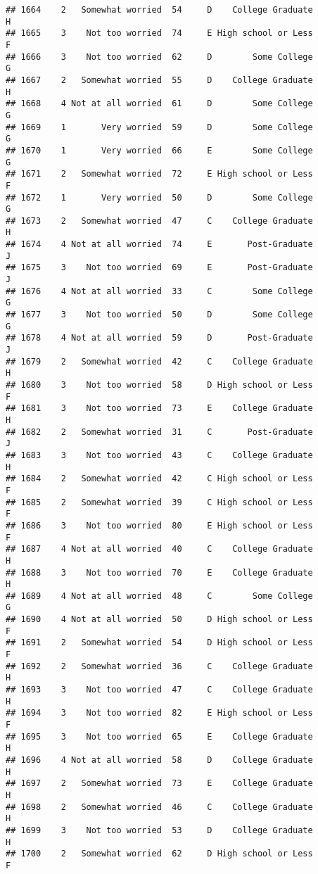 \documentclass[
]{article}
\begin{document}
\begin{verbatim}
## 1664    2   Somewhat worried  54     D    College Graduate         H
## 1665    3    Not too worried  74     E High school or Less         F
## 1666    3    Not too worried  62     D        Some College         G
## 1667    2   Somewhat worried  55     D    College Graduate         H
## 1668    4 Not at all worried  61     D        Some College         G
## 1669    1       Very worried  59     D        Some College         G
## 1670    1       Very worried  66     E        Some College         G
## 1671    2   Somewhat worried  72     E High school or Less         F
## 1672    1       Very worried  50     D        Some College         G
## 1673    2   Somewhat worried  47     C    College Graduate         H
## 1674    4 Not at all worried  74     E       Post-Graduate         J
## 1675    3    Not too worried  69     E       Post-Graduate         J
## 1676    4 Not at all worried  33     C        Some College         G
## 1677    3    Not too worried  50     D        Some College         G
## 1678    4 Not at all worried  59     D       Post-Graduate         J
## 1679    2   Somewhat worried  42     C    College Graduate         H
## 1680    3    Not too worried  58     D High school or Less         F
## 1681    3    Not too worried  73     E    College Graduate         H
## 1682    2   Somewhat worried  31     C       Post-Graduate         J
## 1683    3    Not too worried  43     C    College Graduate         H
## 1684    2   Somewhat worried  42     C High school or Less         F
## 1685    2   Somewhat worried  39     C High school or Less         F
## 1686    3    Not too worried  80     E High school or Less         F
## 1687    4 Not at all worried  40     C    College Graduate         H
## 1688    3    Not too worried  70     E    College Graduate         H
## 1689    4 Not at all worried  48     C        Some College         G
## 1690    4 Not at all worried  50     D High school or Less         F
## 1691    2   Somewhat worried  54     D High school or Less         F
## 1692    2   Somewhat worried  36     C    College Graduate         H
## 1693    3    Not too worried  47     C    College Graduate         H
## 1694    3    Not too worried  82     E High school or Less         F
## 1695    3    Not too worried  65     E    College Graduate         H
## 1696    4 Not at all worried  58     D    College Graduate         H
## 1697    2   Somewhat worried  73     E    College Graduate         H
## 1698    2   Somewhat worried  46     C    College Graduate         H
## 1699    3    Not too worried  53     D    College Graduate         H
## 1700    2   Somewhat worried  62     D High school or Less         F

\end{verbatim}
\end{document}
